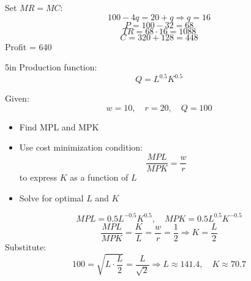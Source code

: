 \documentclass[12pt]{exam}
\begin{document}
\begin{questions}
  \begin{solution}
    Set \( MR = MC \):
    \[
      100 - 4q = 20 + q \Rightarrow q = 16
    \]
    \[
      P = 100 - 32 = 68
    \]
    \[
      TR = 68 \cdot 16 = 1088
    \]
    \[
      C = 320 + 128 = 448
    \]
    Profit = 640
  \end{solution}


  \begin{problem}[20]{5in}
    Production function:
    \[
      Q = L^{0.5}K^{0.5}
    \]

    Given:
    \[
      w = 10, \quad r = 20, \quad Q = 100
    \]

    \begin{itemize}
      \item Find MPL and MPK
      \item Use cost minimization condition:
        \[
          \frac{MPL}{MPK} = \frac{w}{r}
        \]
        to express \( K \) as a function of \( L \)
      \item Solve for optimal \( L \) and \( K \)
    \end{itemize}
  \end{problem}

  \begin{solution}
    \[
      MPL = 0.5L^{-0.5}K^{0.5}, \quad MPK = 0.5L^{0.5}K^{-0.5}
    \]
    \[
      \frac{MPL}{MPK} = \frac{K}{L} = \frac{w}{r} = \frac{1}{2}
      \Rightarrow K = \frac{L}{2}
    \]
    Substitute:
    \[
      100 = \sqrt{L \cdot \frac{L}{2}} = \frac{L}{\sqrt{2}}
      \Rightarrow L \approx 141.4, \quad K \approx 70.7
    \]
  \end{solution}


\end{questions}
\end{document}
